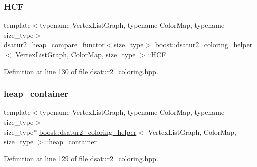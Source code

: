 \subsubsection{\texorpdfstring{H\+CF}{HCF}}
{\footnotesize\ttfamily template$<$typename Vertex\+List\+Graph, typename Color\+Map, typename size\+\_\+type$>$ \\
\hyperlink{structboost_1_1dsatur2__heap__compare__functor}{dsatur2\+\_\+heap\+\_\+compare\+\_\+functor}$<$size\+\_\+type$>$ \hyperlink{classboost_1_1dsatur2__coloring__helper}{boost\+::dsatur2\+\_\+coloring\+\_\+helper}$<$ Vertex\+List\+Graph, Color\+Map, size\+\_\+type $>$\+::H\+CF\hspace{0.3cm}{\ttfamily [private]}}



Definition at line 130 of file dsatur2\+\_\+coloring.\+hpp.

\mbox{\label{classboost_1_1dsatur2__coloring__helper_abee38e86ad7697afd89e0f6b6c684d6e}} 
\subsubsection{\texorpdfstring{heap\+\_\+container}{heap\_container}}
{\footnotesize\ttfamily template$<$typename Vertex\+List\+Graph, typename Color\+Map, typename size\+\_\+type$>$ \\
size\+\_\+type$\ast$ \hyperlink{classboost_1_1dsatur2__coloring__helper}{boost\+::dsatur2\+\_\+coloring\+\_\+helper}$<$ Vertex\+List\+Graph, Color\+Map, size\+\_\+type $>$\+::heap\+\_\+container\hspace{0.3cm}{\ttfamily [private]}}



Definition at line 129 of file dsatur2\+\_\+coloring.\+hpp.

\mbox{\label{classboost_1_1dsatur2__coloring__helper_ae4a14a29af7836813076c4cc1397bfa1}} 
